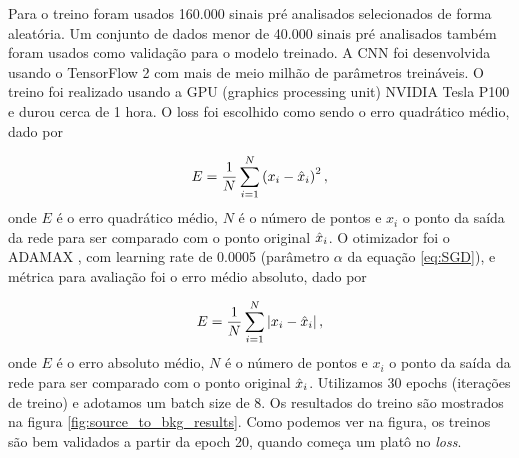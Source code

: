 \documentclass[a4paper,12pt,oneside]{book}
\begin{document}

\par Para o treino foram usados 160.000 sinais pré analisados selecionados de forma aleatória. Um conjunto de dados menor de 40.000 sinais pré analisados também foram usados como validação para o modelo treinado. A CNN foi desenvolvida usando o TensorFlow 2 com mais de meio milhão de parâmetros treináveis. O treino foi realizado usando a GPU (graphics processing unit) NVIDIA Tesla P100 e durou cerca de 1 hora. O loss foi escolhido como sendo o erro quadrático médio, dado por

\begin{equation}\label{eq:erro_quad_m}
    E = \frac{1}{N}\sum_{i = 1}^{N} \left( x_i - \Hat{x}_i\right )^2,
\end{equation}
%
onde $E$ é o erro quadrático médio, $N$ é o número de pontos e $x_i$ o ponto da saída da rede para ser comparado com o ponto original $\Hat{x}_i$. O otimizador foi o ADAMAX \cite{ADAMAX}, com learning rate de 0.0005 (parâmetro $\alpha$ da equação \ref{eq:SGD}), e métrica para avaliação foi o erro médio absoluto, dado por

\begin{equation}\label{eq:erro_abs_m}
    E = \frac{1}{N}\sum_{i = 1}^{N} \left | x_i - \Hat{x}_i\right |,
\end{equation}
%
onde $E$ é o erro absoluto médio, $N$ é o número de pontos e $x_i$ o ponto da saída da rede para ser comparado com o ponto original $\Hat{x}_i$. Utilizamos 30 epochs (iterações de treino) e adotamos um batch size de 8. Os resultados do treino são mostrados na figura \ref{fig:source_to_bkg_results}. Como podemos ver na figura, os treinos são bem validados a partir da epoch 20, quando começa um platô no \textit{loss}.
\end{document}
